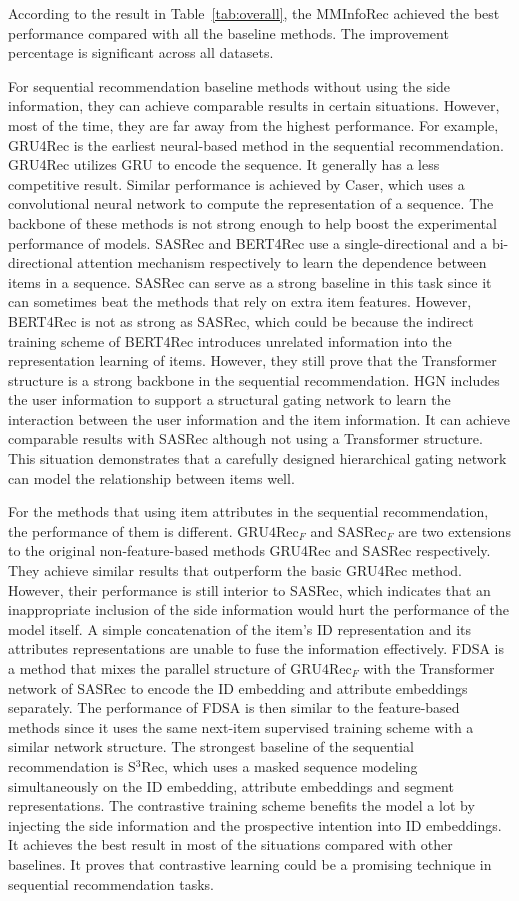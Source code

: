 \documentclass[conference]{IEEEtran}
\begin{document}
According to the result in Table~\ref{tab:overall}, the MMInfoRec achieved the best performance compared with all the baseline methods. The improvement percentage is significant across all datasets.

For sequential recommendation baseline methods without using the side information, they can achieve comparable results in certain situations. However, most of the time, they are far away from the highest performance. For example, GRU4Rec is the earliest neural-based method in the sequential recommendation. GRU4Rec utilizes GRU to encode the sequence. It generally has a less competitive result. Similar performance is achieved by Caser, which uses a convolutional neural network to compute the representation of a sequence. The backbone of these methods is not strong enough to help boost the experimental performance of models. SASRec and BERT4Rec use a single-directional and a bi-directional attention mechanism respectively to learn the dependence between items in a sequence. SASRec can serve as a strong baseline in this task since it can sometimes beat the methods that rely on extra item features. However, BERT4Rec is not as strong as SASRec, which could be because the indirect training scheme of BERT4Rec introduces unrelated information into the representation learning of items. However, they still prove that the Transformer structure is a strong backbone in the sequential recommendation. HGN includes the user information to support a structural gating network to learn the interaction between the user information and the item information. It can achieve comparable results with SASRec although not using a Transformer structure. This situation demonstrates that a carefully designed hierarchical gating network can model the relationship between items well.

For the methods that using item attributes in the sequential recommendation, the performance of them is different. $\text{GRU4Rec}_F$ and $\text{SASRec}_F$ are two extensions to the original non-feature-based methods GRU4Rec and SASRec respectively. They achieve similar results that outperform the basic GRU4Rec method. However, their performance is still interior to SASRec, which indicates that an inappropriate inclusion of the side information would hurt the performance of the model itself. A simple concatenation of the item's ID representation and its attributes representations are unable to fuse the information effectively. FDSA is a method that mixes the parallel structure of $\text{GRU4Rec}_F$ with the Transformer network of SASRec to encode the ID embedding and attribute embeddings separately. The performance of FDSA is then similar to the feature-based methods since it uses the same next-item supervised training scheme with a similar network structure. The strongest baseline of the sequential recommendation is S$^3$Rec, which uses a masked sequence modeling simultaneously on the ID embedding, attribute embeddings and segment representations. The contrastive training scheme benefits the model a lot by injecting the side information and the prospective intention into ID embeddings. It achieves the best result in most of the situations compared with other baselines. It proves that contrastive learning could be a promising technique in sequential recommendation tasks.
\end{document}
